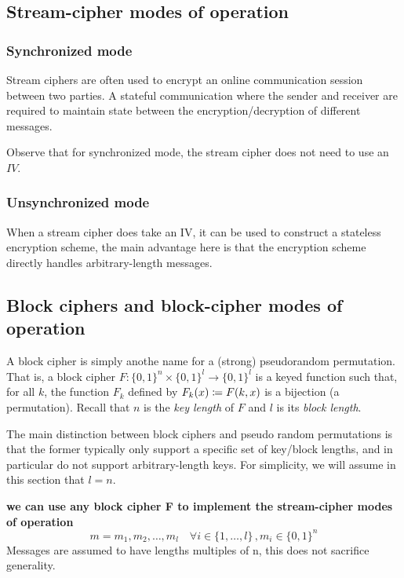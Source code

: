 \documentclass[12pt]{article}
\begin{document}
\subsection{Stream-cipher modes of operation}
\subsubsection{Synchronized mode}
Stream ciphers are often used to encrypt an online communication session between two parties. A stateful communication where the sender and receiver are required to maintain state between the encryption/decryption of diﬀerent messages.

Observe that for synchronized mode, the stream cipher does not need to
use an $IV$.
\subsubsection{Unsynchronized mode}
When a stream cipher does take an IV, it can be used to construct a stateless encryption scheme, the main advantage here is that the encryption scheme directly handles arbitrary-length messages.

\subsection{Block ciphers and block-cipher modes of operation}
A block cipher is simply anothe name for a (strong) pseudorandom permutation. That is, a block cipher $F: \{0,1\}^n \times \{0,1\}^l \rightarrow \{0,1\}^l$ is a keyed function such that, for all $k$, the function $F_k$ defined by $F_k(x) \coloneqq F(k,x)$ is a bijection (a permutation). Recall that $n$ is the \emph{key length} of $F$ and $l$ is its \emph{block length}.

The main distinction between block ciphers and pseudo random permutations is that the former typically only support a specific set of key/block lengths, and in particular do not support arbitrary-length keys. For simplicity, we will assume in this section that $l=n$.

\textbf{we can use any block cipher F to implement the stream-cipher modes of operation}
\begin{equation*}
m=m_1,m_2,\dots,m_l \quad \forall i \in \{1,\dots,l\}\,, m_i \in \{0,1\}^n
\end{equation*}
Messages are assumed to have lengths multiples of n, this does not sacrifice generality.
\newpage
\end{document}
